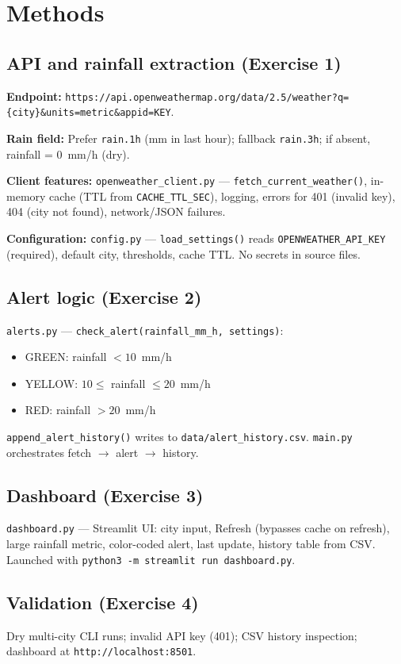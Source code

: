 \documentclass[11pt,a4paper]{article}
\begin{document}
\section{Methods}

\subsection{API and rainfall extraction (Exercise 1)}
\textbf{Endpoint:} \texttt{https://api.openweathermap.org/data/2.5/weather?q=\{city\}\&units=metric\&appid=KEY}.

\textbf{Rain field:} Prefer \texttt{rain.1h} (mm in last hour); fallback \texttt{rain.3h}; if absent, rainfall = 0~mm/h (dry).

\textbf{Client features:} \texttt{openweather\_client.py} --- \texttt{fetch\_current\_weather()}, in-memory cache (TTL from \texttt{CACHE\_TTL\_SEC}), logging, errors for 401 (invalid key), 404 (city not found), network/JSON failures.

\textbf{Configuration:} \texttt{config.py} --- \texttt{load\_settings()} reads \texttt{OPENWEATHER\_API\_KEY} (required), default city, thresholds, cache TTL. No secrets in source files.

\subsection{Alert logic (Exercise 2)}
\texttt{alerts.py} --- \texttt{check\_alert(rainfall\_mm\_h, settings)}:
\begin{itemize}[noitemsep]
  \item GREEN: rainfall $< 10$~mm/h
  \item YELLOW: $10 \le$ rainfall $\le 20$~mm/h
  \item RED: rainfall $> 20$~mm/h
\end{itemize}
\texttt{append\_alert\_history()} writes to \texttt{data/alert\_history.csv}. \texttt{main.py} orchestrates fetch $\rightarrow$ alert $\rightarrow$ history.

\subsection{Dashboard (Exercise 3)}
\texttt{dashboard.py} --- Streamlit UI: city input, Refresh (bypasses cache on refresh), large rainfall metric, color-coded alert, last update, history table from CSV. Launched with \texttt{python3 -m streamlit run dashboard.py}.

\subsection{Validation (Exercise 4)}
Dry multi-city CLI runs; invalid API key (401); CSV history inspection; dashboard at \texttt{http://localhost:8501}.
\end{document}
